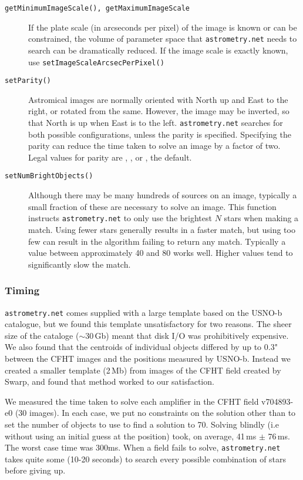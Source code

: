 \begin{description}
\item[{\tt getMinimumImageScale(), getMaximumImageScale}] If the plate scale (in arcseconds per pixel) of the image is known or can be constrained, the volume of parameter space that {\tt astrometry.net} needs to search can be dramatically reduced. If the image scale is exactly known, use {\tt setImageScaleArcsecPerPixel()}

\item[{\tt setParity()}] Astromical images are normally oriented with North up and East to the right, or rotated from the same. However, the image may be inverted, so that North is up when East is to the left. {\tt astrometry.net} searches for both possible configurations, unless the parity is specified. Specifying the parity can reduce the time taken to solve an image by a factor of two. Legal values for parity are , , or , the default.

\item[{\tt setNumBrightObjects()}] Although there may be many hundreds of sources on an image, typically a small fraction of these are necessary to solve an image. This function instructs {\tt astrometry.net} to only use the brightest $N$ stars when making a match. Using fewer stars generally results in a faster match, but using too few can result in the algorithm failing to return any match. Typically a value between approximately 40 and 80 works well. Higher values tend to significantly slow the match. 
\end{description}

\subsubsection{Timing}

{\tt astrometry.net} comes supplied with a large template based on the USNO-b catalogue, but we found this template unsatisfactory for two reasons. The sheer size of the cataloge ($\sim$30\,Gb) meant that disk I/O was prohibitively expensive. We also found that the centroids of individual objects differed by up to 0.3" between the CFHT images and the positions measured by USNO-b. Instead we created a smaller template (2\,Mb) from images of the CFHT field created by Swarp, and found that method worked to our satisfaction.

We measured the time taken to solve each amplifier in the CFHT field v704893-e0 (30 images). In each case, we put no constraints on the solution other than to set the number of objects to use to find a solution to 70. Solving blindly (i.e without using an initial guess at the position) took, on average, 41\,ms $\pm$ 76\,ms. The worst case time was 300ms. When a field fails to solve, {\tt astrometry.net} takes quite some (10-20 seconds) to search every possible combination of stars before giving up. 

